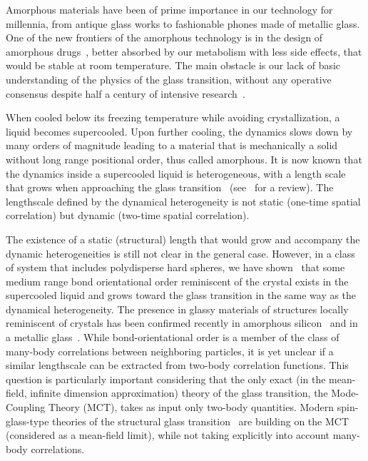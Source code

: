 \documentclass[twocolumn,superscriptaddress]{revtex4}
\begin{document}
Amorphous materials have been of prime importance in our technology for millennia, from antique glass works to fashionable phones made of metallic glass. One of the new frontiers of the amorphous technology is in the design of amorphous drugs~\cite{Petit2006,Grzybowska2012}, better absorbed by our metabolism with less side effects, that would be stable at room temperature. The main obstacle is our lack of basic understanding of the physics of the glass transition, without any operative consensus despite half a century of intensive research~\citep{cavagna2009supercooled,BerthierR}.

When cooled below its freezing temperature while avoiding crystallization, a liquid becomes supercooled. Upon further cooling, the dynamics slows down by many orders of magnitude leading to a material that is mechanically a solid without long range positional order, thus called amorphous. It is now known that the dynamics inside a supercooled liquid is heterogeneous, with a length scale that grows when approaching the glass transition~\citep{yamamoto1998,Donati1999a} (see~\citep{BerthierR} for a review). The lengthscale defined by the dynamical heterogeneity is not static (one-time spatial correlation) but dynamic (two-time spatial correlation).

The existence of a static (structural) length that would grow and accompany the dynamic heterogeneities is still not clear in the general case. However, in a class of system that includes polydisperse hard spheres, we have shown~\cite{tanaka} that some medium range bond orientational order reminiscent of the crystal exists in the supercooled liquid and grows toward the glass transition in the same way as the dynamical heterogeneity. The presence in glassy materials of structures locally reminiscent of crystals has been confirmed recently in amorphous silicon~\cite{Treacy2012} and in a metallic glass~\cite{Hwang2012}. While bond-orientational order is a member of the class of many-body
correlations between neighboring particles, it is yet unclear if a similar lengthscale can be extracted
from two-body correlation functions. This question is particularly important considering that the only exact (in the mean-field, infinite dimension approximation) theory of the glass transition, the Mode-Coupling Theory (MCT), takes as input only two-body quantities. Modern spin-glass-type theories of the structural glass transition~\cite{lubchenko2007,Biroli2008,Parisi2010} are building on the MCT (considered as a mean-field limit), while not taking explicitly into account many-body correlations.
\end{document}
